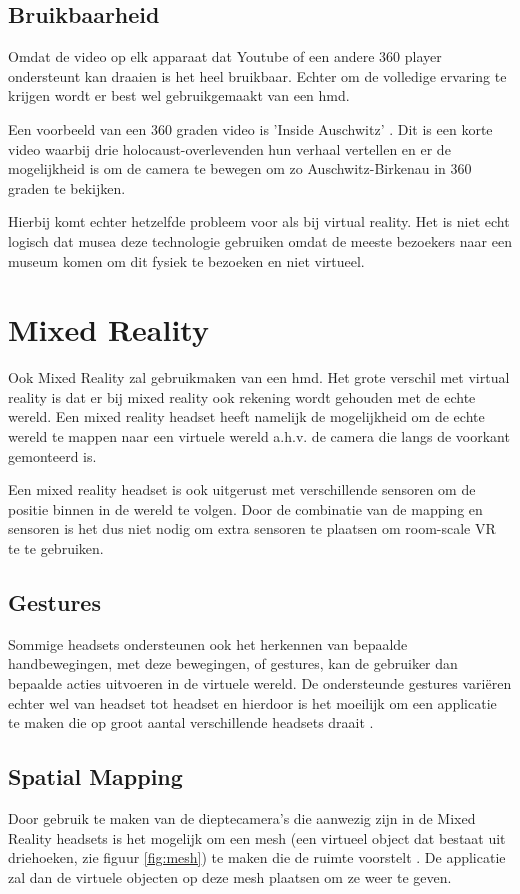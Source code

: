 \subsection{Bruikbaarheid}
Omdat de video op elk apparaat dat Youtube of een andere 360 player ondersteunt kan draaien is het heel bruikbaar. Echter om de volledige ervaring te krijgen wordt er best wel gebruikgemaakt van een \acrshort{hmd}.

Een voorbeeld van een 360 graden video is 'Inside Auschwitz' \autocite{WDR2017}. Dit is een korte video waarbij drie holocaust-overlevenden hun verhaal vertellen en er de mogelijkheid is om de camera te bewegen om zo Auschwitz-Birkenau in 360 graden te bekijken. 

Hierbij komt echter hetzelfde probleem voor als bij virtual reality. Het is niet echt logisch dat musea deze technologie gebruiken omdat de meeste bezoekers naar een museum komen om dit fysiek te bezoeken en niet virtueel.

\section{Mixed Reality} \label{sec:mixedreality}
Ook Mixed Reality zal gebruikmaken van een \acrshort{hmd}. Het grote verschil met virtual reality is dat er bij mixed reality ook rekening wordt gehouden met de echte wereld. Een mixed reality headset heeft namelijk de mogelijkheid om de echte wereld te mappen naar een virtuele wereld a.h.v. de camera die langs de voorkant gemonteerd is.

Een mixed reality headset is ook uitgerust met verschillende sensoren om de positie binnen in de wereld te volgen. Door de combinatie van de mapping en sensoren is het dus niet nodig om extra sensoren te plaatsen om room-scale VR te te gebruiken.

\subsection{Gestures}
Sommige headsets ondersteunen ook het herkennen van bepaalde handbewegingen, met deze bewegingen, of gestures, kan de gebruiker dan bepaalde acties uitvoeren in de virtuele wereld. De ondersteunde gestures variëren echter wel van headset tot headset en hierdoor is het moeilijk om een applicatie te maken die op groot aantal verschillende headsets draait \autocite{MicrosoftGestures}.


\subsection{Spatial Mapping}
Door gebruik te maken van de dieptecamera's die aanwezig zijn in de Mixed Reality headsets is het mogelijk om een mesh (een virtueel object dat bestaat uit driehoeken, zie figuur \ref{fig:mesh}) te maken die de ruimte voorstelt \autocite{Evans2017}. De applicatie zal dan de virtuele objecten op deze mesh plaatsen om ze weer te geven. 


